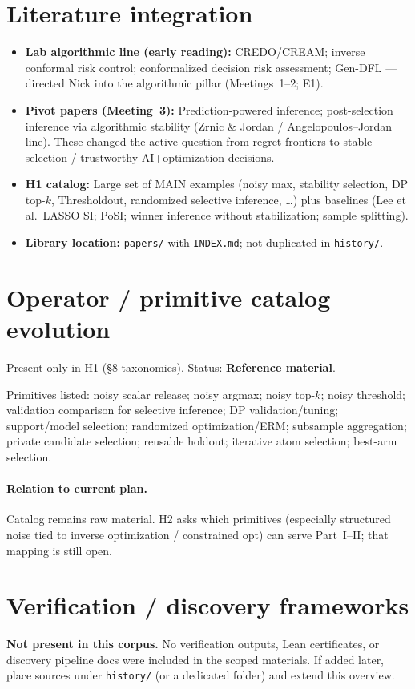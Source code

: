 \documentclass[11pt]{article}
\begin{document}
\section{Literature integration}
\begin{itemize}[leftmargin=*]
  \item \textbf{Lab algorithmic line (early reading):} CREDO/CREAM; inverse conformal risk
        control; conformalized decision risk assessment; Gen-DFL --- directed Nick into the
        algorithmic pillar (Meetings~1--2; E1).
  \item \textbf{Pivot papers (Meeting~3):} Prediction-powered inference; post-selection inference
        via algorithmic stability (Zrnic \& Jordan / Angelopoulos--Jordan line). These changed
        the active question from regret frontiers to stable selection / trustworthy
        AI+optimization decisions.
  \item \textbf{H1 catalog:} Large set of MAIN examples (noisy max, stability selection, DP
        top-$k$, Thresholdout, randomized selective inference, \ldots) plus baselines (Lee et al.\
        LASSO SI; PoSI; winner inference without stabilization; sample splitting).
  \item \textbf{Library location:} \texttt{papers/} with \texttt{INDEX.md}; not duplicated in
        \texttt{history/}.
\end{itemize}

\section{Operator / primitive catalog evolution}
Present only in H1 (\S8 taxonomies). Status: \textbf{Reference material}.

Primitives listed: noisy scalar release; noisy argmax; noisy top-$k$; noisy threshold;
validation comparison for selective inference; DP validation/tuning; support/model selection;
randomized optimization/ERM; subsample aggregation; private candidate selection; reusable
holdout; iterative atom selection; best-arm selection.

\paragraph{Relation to current plan.}
Catalog remains raw material. H2 asks which primitives (especially structured noise tied to
inverse optimization / constrained opt) can serve Part~I--II; that mapping is still open.

\section{Verification / discovery frameworks}
\textbf{Not present in this corpus.} No verification outputs, Lean certificates, or discovery
pipeline docs were included in the scoped materials. If added later, place sources under
\texttt{history/} (or a dedicated folder) and extend this overview.
\end{document}
